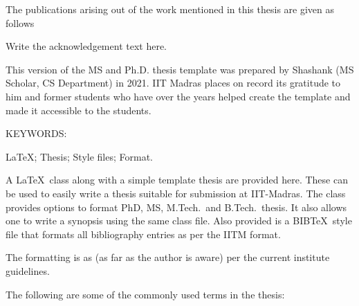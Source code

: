 \documentclass[MS]{iitmdiss}
\newcommand\blankpage{%
    \null
    \thispagestyle{empty}%
    \addtocounter{page}{-1}%
    \newpage}
\begin{document}
The publications arising out of the work mentioned in this thesis are given as follows
\pagebreak
\afterpage{\blankpage}
\acknowledgements

Write the acknowledgement text here.

This version of the MS and Ph.D. thesis template was prepared by Shashank (MS Scholar, CS Department) in 2021.
IIT Madras places on record its gratitude to him and former students who have over the years helped create the template and made it accessible to the students.


\abstract

\noindent KEYWORDS: \hspace*{0.5em} \parbox[t]{4.4in}{\LaTeX ; Thesis;
  Style files; Format.}

\vspace*{24pt}

\noindent A \LaTeX\ class along with a simple template thesis are
provided here.  These can be used to easily write a thesis suitable
for submission at IIT-Madras.  The class provides options to format
PhD, MS, M.Tech.\ and B.Tech.\ thesis.  It also allows one to write a
synopsis using the same class file.  Also provided is a BIB\TeX\ style
file that formats all bibliography entries as per the IITM format.

The formatting is as (as far as the author is aware) per the current
institute guidelines.

\pagebreak


\begin{singlespace}
\tableofcontents
\thispagestyle{empty}

\listoftables
{}
\listoffigures
{}
\end{singlespace}



\glossary
The following are some of the commonly used terms in the thesis:\\

\vspace{-0.5cm}
\end{document}
